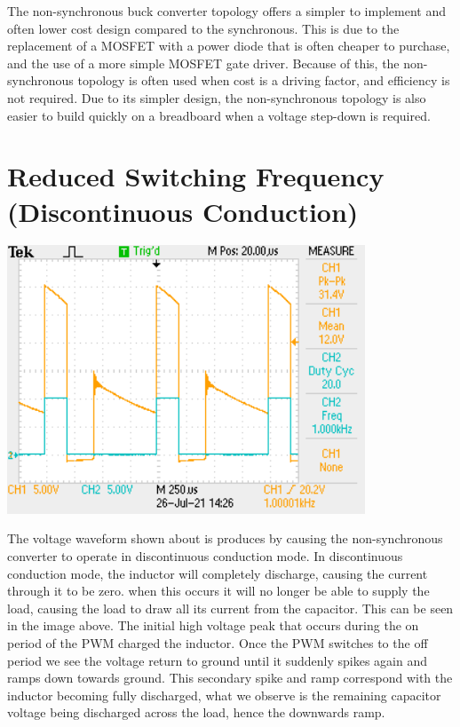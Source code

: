 \documentclass[a4paper,11pt]{article}
\begin{document}
\begin{preview}
The non-synchronous buck converter topology offers a simpler to implement and often lower cost design compared to the synchronous. This is due to the replacement of a MOSFET with a power diode that is often cheaper to purchase, and the use of a more simple MOSFET gate driver. Because of this, the non-synchronous topology is often used when cost is a driving factor, and efficiency is not required. Due to its simpler design, the non-synchronous topology is also easier to build quickly on a breadboard when a voltage step-down is required. 

\section{Reduced Switching Frequency (Discontinuous Conduction)}
  
  \begin{center}
    \includegraphics[width=0.8\textwidth]{discontinuious_opperation.png}
  \end{center}

The voltage waveform shown about is produces by causing the non-synchronous converter to operate in discontinuous conduction mode. In discontinuous conduction mode, the inductor will completely discharge, causing the current through it to be zero. when this occurs it will no longer be able to supply the load, causing the load to draw all its current from the capacitor. This can be seen in the image above. The initial high voltage peak that occurs during the on period of the PWM charged the inductor. Once the PWM switches to the off period we see the voltage return to ground until it suddenly spikes again and ramps down towards ground. This secondary spike and ramp correspond with the inductor becoming fully discharged, what we observe is the remaining capacitor voltage being discharged across the load, hence the downwards ramp.

\end{preview}
\end{document}
